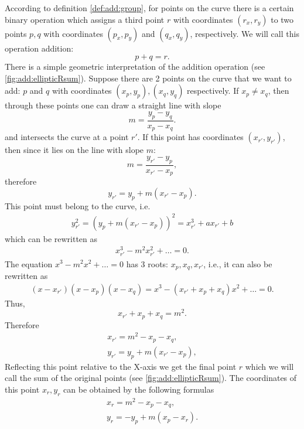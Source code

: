 According to definition \ref{def:add:group}, for points on the curve there is a certain binary operation which assigns a third point $r$ with coordinates $(r_x, r_y)$ to two points $p, q$ with coordinates $(p_x, p_y)$ and $(q_x, q_y)$, respectively. We will call this operation addition:
\[
p + q = r.
\]
There is a simple geometric interpretation of the addition operation (see \autoref{fig:add:ellipticRsum}). Suppose there are 2 points on the curve that we want to add: $p$ and $q$ with coordinates $(x_p, y_p), (x_q, y_q)$ respectively. If $x_p \ne x_q$, then through these points one can draw a straight line with slope
\[
m = \frac{y_p - y_q}{x_p - x_q}.
\]
and intersects the curve at a point $r'$. If this point has coordinates $(x_{r'}, y_{r'})$, then since it lies on the line with slope $m$:
\[
m = \frac{y_{r'} - y_p}{x_{r'} - x_p},
\]
therefore
\[
y_{r'} = y_p + m \left(x_{r'} - x_p\right).
\]
This point must belong to the curve, i.e.
\begin{eqnarray}
y_{r'}^2 = \left(y_p + m \left(x_{r'} - x_p\right)\right)^2 = x_{r'}^3
+ a x_{r'} + b
\nonumber
\end{eqnarray}
which can be rewritten as
\begin{eqnarray}
x_{r'}^3 - m^2 x_{r'}^2 + \dots = 0.
\nonumber
\end{eqnarray}
The equation $x^3 - m^2 x^2 + \dots = 0$ has 3 roots: $x_p, x_q,
x_{r'}$, i.e., it can also be rewritten as
\begin{eqnarray}
(x - x_{r'})(x - x_p)(x - x_q) = x^3 - (x_{r'} + x_p + x_q) x^2 +
  \dots = 0.
\nonumber
\end{eqnarray}
Thus, 
\[
x_{r'} + x_p + x_q = m^2.
\]
Therefore
\begin{eqnarray}
x_{r'} = m^2 - x_p - x_q,
\nonumber \\
y_{r'} = y_p + m \left(x_{r'} - x_p\right),
\nonumber
\end{eqnarray}
Reflecting this point relative to the X-axis we get the final point $r$
which we will call the sum of the original points (see
\autoref{fig:add:ellipticRsum}). The coordinates of this point $x_r, y_r$
can be obtained by the following formulas
\begin{eqnarray}
x_{r} = m^2 - x_p - x_q,
\nonumber \\
y_{r} = - y_p + m \left(x_p - x_r\right).
\label{eq:add:discretmath:elliptic:add}
\end{eqnarray}




